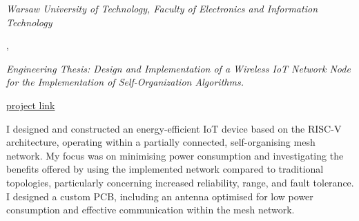 
\textit{Warsaw University of Technology, Faculty of Electronics and Information Technology}

,

\textit{Engineering Thesis: Design and Implementation of a Wireless IoT Network Node for the Implementation of Self-Organization Algorithms.}

\href{https://github.com/lyraei/ion_board}{project link}

\vspace{2pt}

I designed and constructed an energy-efficient IoT device based on the RISC-V architecture, operating within a partially connected, self-organising mesh network. My focus was on minimising power consumption and investigating the benefits offered by using the implemented network compared to traditional topologies, particularly concerning increased reliability, range, and fault tolerance. I designed a custom PCB, including an antenna optimised for low power consumption and effective communication within the mesh network.

